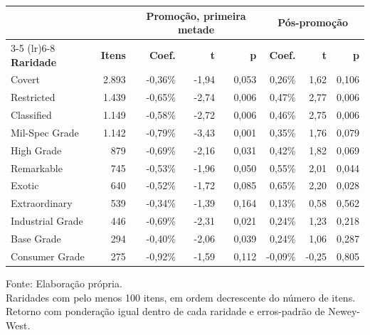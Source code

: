 \begingroup
\setlength{}
\setlength{}
\fontsize{12.0pt}{14.4pt}\selectfont

\setlength{\LTpost}{0mm}
\begin{longtable}{@{\extracolsep{\fill}}lrrrrrrr}

\toprule
 &  & \multicolumn{3}{c}{\textbf{Promoção, primeira metade}} & \multicolumn{3}{c}{\textbf{Pós-promoção}} \\ 
\cmidrule(lr){3-5} \cmidrule(lr){6-8}
\textbf{Raridade} & \textbf{Itens} & \textbf{Coef.} & \textbf{t} & \textbf{p} & \textbf{Coef.} & \textbf{t} & \textbf{p} \\ 
\midrule\addlinespace[2.5pt]
Covert & 2.893 & -0,36\% & -1,94 & 0,053 & 0,26\% & 1,62 & 0,106 \\
Restricted & 1.439 & -0,65\% & -2,74 & 0,006 & 0,47\% & 2,77 & 0,006 \\
Classified & 1.149 & -0,58\% & -2,72 & 0,006 & 0,46\% & 2,75 & 0,006 \\
Mil-Spec Grade & 1.142 & -0,79\% & -3,43 & 0,001 & 0,35\% & 1,76 & 0,079 \\
High Grade & 879 & -0,69\% & -2,16 & 0,031 & 0,42\% & 1,82 & 0,069 \\
Remarkable & 745 & -0,53\% & -1,96 & 0,050 & 0,55\% & 2,01 & 0,044 \\
Exotic & 640 & -0,52\% & -1,72 & 0,085 & 0,65\% & 2,20 & 0,028 \\
Extraordinary & 539 & -0,34\% & -1,39 & 0,164 & 0,13\% & 0,58 & 0,562 \\
Industrial Grade & 446 & -0,69\% & -2,31 & 0,021 & 0,24\% & 1,23 & 0,218 \\
Base Grade & 294 & -0,40\% & -2,06 & 0,039 & 0,24\% & 1,06 & 0,287 \\
Consumer Grade & 275 & -0,92\% & -1,59 & 0,112 & -0,09\% & -0,25 & 0,805 \\
\bottomrule
\end{longtable}
\begin{minipage}{\linewidth}
Fonte: Elaboração própria.\\
Raridades com pelo menos 100 itens, em ordem decrescente do número de itens. Retorno com ponderação igual dentro de cada raridade e erros-padrão de Newey-West.\\
\end{minipage}
\endgroup
